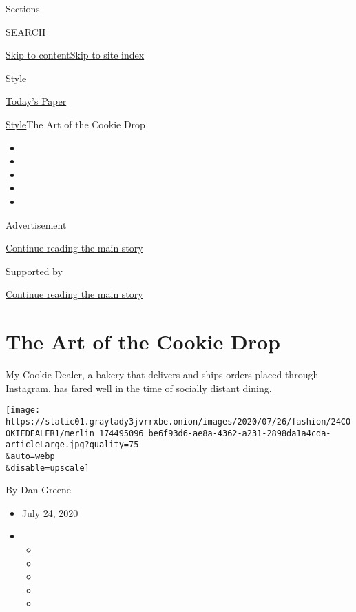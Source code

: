 Sections

SEARCH

\protect\hyperlink{site-content}{Skip to
content}\protect\hyperlink{site-index}{Skip to site index}

\href{https://www.nytimes3xbfgragh.onion/section/style}{Style}

\href{https://myaccount.nytimes3xbfgragh.onion/auth/login?response_type=cookie\&client_id=vi}{}

\href{https://www.nytimes3xbfgragh.onion/section/todayspaper}{Today's
Paper}

\href{/section/style}{Style}\textbar{}The Art of the Cookie Drop

\begin{itemize}
\item
\item
\item
\item
\item
\end{itemize}

Advertisement

\protect\hyperlink{after-top}{Continue reading the main story}

Supported by

\protect\hyperlink{after-sponsor}{Continue reading the main story}

\hypertarget{the-art-of-the-cookie-drop}{%
\section{The Art of the Cookie Drop}\label{the-art-of-the-cookie-drop}}

My Cookie Dealer, a bakery that delivers and ships orders placed through
Instagram, has fared well in the time of socially distant dining.

\texttt{[image: https://static01.graylady3jvrrxbe.onion/images/2020/07/26/fashion/24COOKIEDEALER1/merlin\_174495096\_be6f93d6-ae8a-4362-a231-2898da1a4cda-articleLarge.jpg?quality=75\\\&auto=webp\\\&disable=upscale]}

By Dan Greene

\begin{itemize}
\item
  July 24, 2020
\item
  \begin{itemize}
  \item
  \item
  \item
  \item
  \item
  \end{itemize}
\end{itemize}

